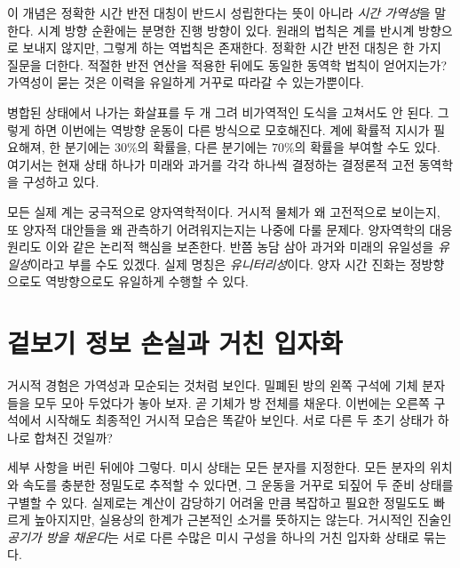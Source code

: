 이 개념은 정확한 시간 반전 대칭이 반드시 성립한다는 뜻이 아니라 \emph{시간 가역성}을 말한다. 시계 방향 순환에는 분명한 진행 방향이 있다. 원래의 법칙은 계를 반시계 방향으로 보내지 않지만, 그렇게 하는 역법칙은 존재한다. 정확한 시간 반전 대칭은 한 가지 질문을 더한다. 적절한 반전 연산을 적용한 뒤에도 동일한 동역학 법칙이 얻어지는가? 가역성이 묻는 것은 이력을 유일하게 거꾸로 따라갈 수 있는가뿐이다.

\begin{classroomqa}
\end{classroomqa}

병합된 상태에서 나가는 화살표를 두 개 그려 비가역적인 도식을 고쳐서도 안 된다. 그렇게 하면 이번에는 역방향 운동이 다른 방식으로 모호해진다. 계에 확률적 지시가 필요해져, 한 분기에는 \(30\%\)의 확률을, 다른 분기에는 \(70\%\)의 확률을 부여할 수도 있다. 여기서는 현재 상태 하나가 미래와 과거를 각각 하나씩 결정하는 결정론적 고전 동역학을 구성하고 있다.

모든 실제 계는 궁극적으로 양자역학적이다. 거시적 물체가 왜 고전적으로 보이는지, 또 양자적 대안들을 왜 관측하기 어려워지는지는 나중에 다룰 문제다. 양자역학의 대응 원리도 이와 같은 논리적 핵심을 보존한다. 반쯤 농담 삼아 과거와 미래의 유일성을 \emph{유일성}이라고 부를 수도 있겠다. 실제 명칭은 \emph{유니터리성}이다. 양자 시간 진화는 정방향으로도 역방향으로도 유일하게 수행할 수 있다.

\section{겉보기 정보 손실과 거친 입자화}

거시적 경험은 가역성과 모순되는 것처럼 보인다. 밀폐된 방의 왼쪽 구석에 기체 분자들을 모두 모아 두었다가 놓아 보자. 곧 기체가 방 전체를 채운다. 이번에는 오른쪽 구석에서 시작해도 최종적인 거시적 모습은 똑같아 보인다. 서로 다른 두 초기 상태가 하나로 합쳐진 것일까?

세부 사항을 버린 뒤에야 그렇다. 미시 상태는 모든 분자를 지정한다. 모든 분자의 위치와 속도를 충분한 정밀도로 추적할 수 있다면, 그 운동을 거꾸로 되짚어 두 준비 상태를 구별할 수 있다. 실제로는 계산이 감당하기 어려울 만큼 복잡하고 필요한 정밀도도 빠르게 높아지지만, 실용상의 한계가 근본적인 소거를 뜻하지는 않는다. 거시적인 진술인 \emph{공기가 방을 채운다}는 서로 다른 수많은 미시 구성을 하나의 거친 입자화 상태로 묶는다.

